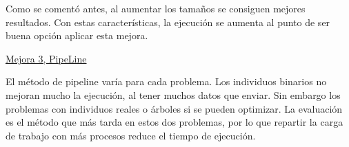 

Como se comentó antes, al aumentar los tamaños se consiguen mejores resultados. Con estas características, la ejecución se aumenta al punto de ser buena opción aplicar esta mejora.

\underline{Mejora 3, PipeLine}

El método de pipeline varía para cada problema. Los individuos binarios no mejoran mucho la ejecución, al tener muchos datos que enviar. Sin embargo los problemas con individuos reales o árboles si se pueden optimizar. La evaluación es el método que más tarda en estos dos problemas, por lo que repartir la carga de trabajo con más procesos reduce el tiempo de ejecución.


